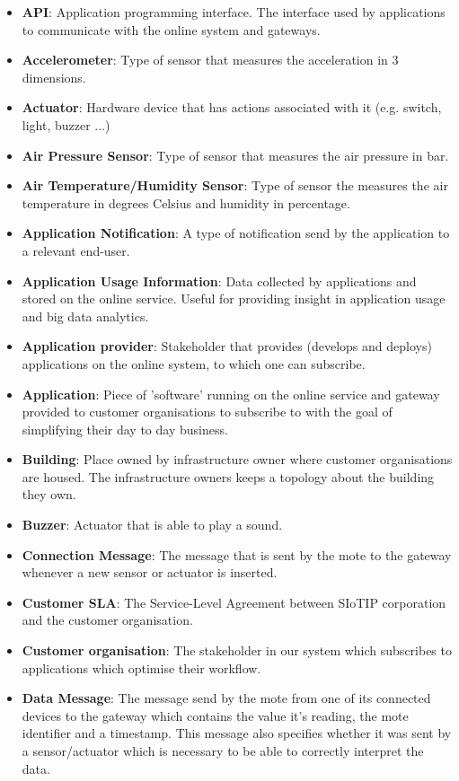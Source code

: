 \documentclass[english]{sareport}
\begin{document}
\begin{itemize}
	\item \textbf{API}: Application programming interface. The interface used by applications to communicate with the online system and gateways.
	\item \textbf{Accelerometer}: Type of sensor that measures the acceleration in 3 dimensions.
	\item \textbf{Actuator}: Hardware device that has actions associated with it (e.g. switch, light, buzzer ...)
	\item \textbf{Air Pressure Sensor}: Type of sensor that measures the air pressure in bar.
	\item \textbf{Air Temperature/Humidity Sensor}: Type of sensor the measures the air temperature in degrees Celsius and humidity in percentage.
	\item \textbf{Application Notification}: A type of notification send by the application to a relevant end-user.
	\item \textbf{Application Usage Information}: Data collected by applications and stored on the online service. Useful for providing insight in application usage and big data analytics.
	\item \textbf{Application provider}: Stakeholder that provides (develops and deploys) applications on the online system, to which one can subscribe.
	\item \textbf{Application}: Piece of 'software' running on the online service and gateway provided to customer organisations to subscribe to with the goal of simplifying their day to day business.
	\item \textbf{Building}: Place owned by infrastructure owner where customer organisations are housed. The infrastructure owners keeps a topology about the building they own.
	\item \textbf{Buzzer}: Actuator that is able to play a sound.
	\item \textbf{Connection Message}: The message that is sent by the mote to the gateway whenever a new sensor or actuator is inserted.
	\item \textbf{Customer SLA}: The Service-Level Agreement between SIoTIP corporation and the customer organisation.
	\item \textbf{Customer organisation}: The stakeholder in our system which subscribes to applications which optimise their workflow.
	\item \textbf{Data Message}: The message send by the mote from one of its connected devices to the gateway which contains the value it's reading, the mote identifier and a timestamp. This message also specifies whether it was sent by a sensor/actuator which is necessary to be able to correctly interpret the data.

\end{itemize}
\end{document}
